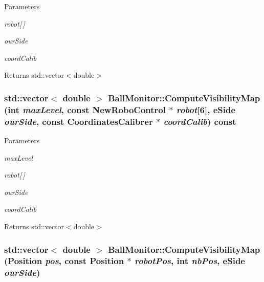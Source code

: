 \begin{DoxyParams}{Parameters}
\item[{\em robot\mbox{[}$\,$\mbox{]}}]\item[{\em ourSide}]\item[{\em coordCalib}]\end{DoxyParams}
\begin{DoxyReturn}{Returns}
std::vector$<$double$>$ 
\end{DoxyReturn}
\hypertarget{classBallMonitor_aad046acf9df6b0381ab3b1b8351e97c5}{
\subsubsection[{ComputeVisibilityMap}]{\setlength{\rightskip}{0pt plus 5cm}std::vector$<$ double $>$ BallMonitor::ComputeVisibilityMap (int {\em maxLevel}, \/  const {\bf NewRoboControl} $\ast$ {\em robot}\mbox{[}6\mbox{]}, \/  eSide {\em ourSide}, \/  const {\bf CoordinatesCalibrer} $\ast$ {\em coordCalib}) const}}
\label{classBallMonitor_aad046acf9df6b0381ab3b1b8351e97c5}

\begin{DoxyParams}{Parameters}
\item[{\em maxLevel}]\item[{\em robot\mbox{[}$\,$\mbox{]}}]\item[{\em ourSide}]\item[{\em coordCalib}]\end{DoxyParams}
\begin{DoxyReturn}{Returns}
std::vector$<$double$>$ 
\end{DoxyReturn}
\hypertarget{classBallMonitor_a53e07299cf403dd036cab543d37fbf92}{
\subsubsection[{ComputeVisibilityMap}]{\setlength{\rightskip}{0pt plus 5cm}std::vector$<$ double $>$ BallMonitor::ComputeVisibilityMap (Position {\em pos}, \/  const Position $\ast$ {\em robotPos}, \/  int {\em nbPos}, \/  eSide {\em ourSide})}}
\label{classBallMonitor_a53e07299cf403dd036cab543d37fbf92}

